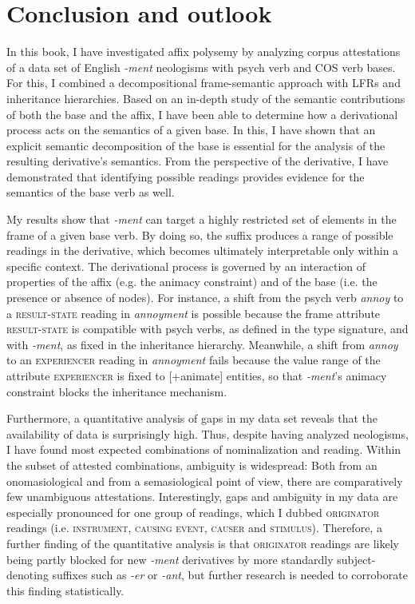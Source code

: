 \chapter{Conclusion and outlook}\label{ch:conclusion}\largerpage[2]

In this book, I have investigated affix polysemy by analyzing corpus attestations of a data set of English \textit{-ment} neologisms with psych verb and COS verb bases. For this, I combined a decompositional frame-semantic approach with LFRs and inheritance hierarchies. 
Based on an in-depth study of the semantic contributions of both the base and the affix, I have been able to determine how a derivational process acts on the semantics of a given base. 
In this, I have shown that an explicit semantic decomposition of the base is essential for the analysis of the resulting derivative's semantics. From the perspective of the derivative, I have demonstrated that identifying possible readings provides evidence for the semantics of the base verb as well.

My results show that \textit{-ment} can target a highly restricted set of elements in the frame of a given base verb. By doing so, the suffix produces a range of possible readings in the derivative, which becomes ultimately interpretable only within a specific context.  
The derivational process is governed by an interaction of properties of the affix (e.g. the animacy constraint) and of the base (i.e. the presence or absence of nodes).
For instance, a shift from the psych verb \textit{annoy} to a \textsc{result-state} reading in \textit{annoyment} is possible because the frame attribute \textsc{result-state} is compatible with psych verbs, as defined in the type signature, and with \textit{-ment}, as fixed in the inheritance hierarchy. 
Meanwhile, a shift from \textit{annoy} to an \textsc{experiencer} reading in \textit{annoyment} fails because the value range of the attribute \textsc{experiencer} is fixed to [+animate] entities, so that \textit{-ment}'s animacy constraint blocks the inheritance mechanism.

Furthermore, a quantitative analysis of gaps in my data set reveals that the availability of data is surprisingly high. Thus, despite having analyzed neologisms, I have found most expected combinations of nominalization and reading. Within the subset of attested combinations, ambiguity is widespread: Both from an onomasiological and from a semasiological point of view, there are comparatively few unambiguous attestations.
Interestingly, gaps and ambiguity in my data are especially pronounced for one group of readings, which I dubbed \textsc{originator} readings (i.e. \textsc{instrument, causing event, causer} and \textsc{stimulus}). Therefore, a further finding of the quantitative analysis is that \textsc{originator} readings are likely being partly blocked for new \textit{-ment} derivatives by more standardly subject-denoting suffixes such as \textit{-er} or \textit{-ant}, but further research is needed to corroborate this finding statistically. 

